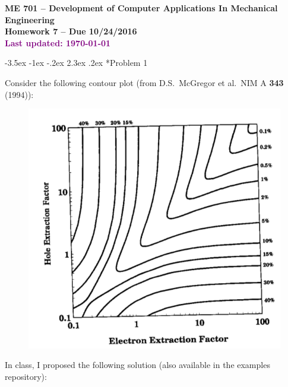 \documentclass[11pt]{article}
\makeatletter
\renewcommand\section{\@startsection{section}{1}{\z@}%
                                  {-3.5ex \@plus -1ex \@minus -.2ex}%
                                  {2.3ex \@plus.2ex}%
                                  {\normalfont\bfseries}}
\makeatother
\begin{document}
{\large
  \begin{center}
    {\bf ME 701 -- Development of Computer Applications In Mechanical Engineering \\ 
         Homework 7  -- Due 10/24/2016 \\
         \vspace{12pt}
         \textcolor{purple}{Last updated: \today}
    }
  \end{center}

\setlength{\unitlength}{1in}

}

\vspace{12pt}







\section*{Problem 1}

Consider the following contour plot (from D.S.~McGregor et al.~NIM A {\bf 343} (1994)):

\begin{figure}[ht]
    \centering
    \includegraphics[keepaspectratio, width = 3.0 in]
                    {original_contour}
\end{figure}

In class, I proposed the following solution (also available in the 
examples repository):
\end{document}
